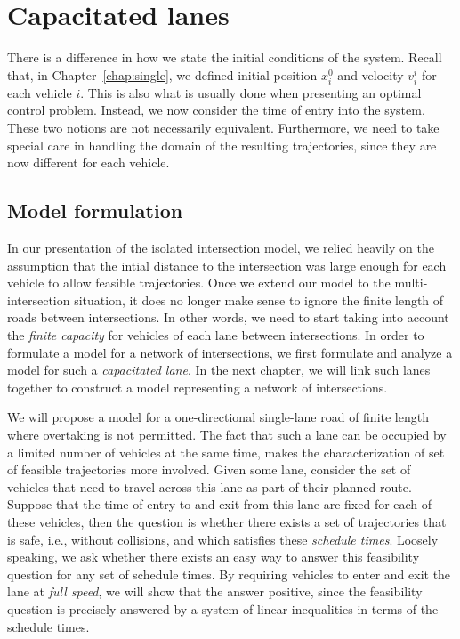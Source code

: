 \documentclass[a4paper]{report}
\theoremstyle{definition}
\theoremstyle{plain}
\newcommand\note[1]{{\color{Navy}#1}}
\begin{document}
\chapter{Capacitated lanes}\label{chap:network}

\note{
There is a difference in how we state the initial conditions of the system.
%
Recall that, in Chapter~\ref{chap:single}, we defined initial position
$x_{i}^{0}$ and velocity $v_{i}^{i}$ for each vehicle $i$.
This is also what is usually done when presenting an optimal control problem.
%
Instead, we now consider the time of entry into the system.
%
These two notions are not necessarily equivalent.
%
Furthermore, we need to take special care in handling the domain of the
resulting trajectories, since they are now different for each vehicle.
}

\section{Model formulation}

In our presentation of the isolated intersection model, we relied heavily on the
assumption that the intial distance to the intersection was large enough for
each vehicle to allow feasible trajectories.
%
Once we extend our model to the multi-intersection situation, it does no longer
make sense to ignore the finite length of roads between intersections. In other
words, we need to start taking into account the \emph{finite capacity} for
vehicles of each lane between intersections.
%
In order to formulate a model for a network of intersections, we first formulate
and analyze a model for such a \emph{capacitated lane}.
%
In the next chapter, we will link such lanes together to construct a model
representing a network of intersections.

We will propose a model for a one-directional single-lane road of finite length
where overtaking is not permitted.
%
The fact that such a lane can be occupied by a limited number of vehicles at the
same time, makes the characterization of set of feasible trajectories more
involved.
%
Given some lane, consider the set of vehicles that need to travel across this
lane as part of their planned route. Suppose that the time of entry to and exit
from this lane are fixed for each of these vehicles, then the question is
whether there exists a set of trajectories that is safe, i.e., without
collisions, and which satisfies these \emph{schedule times}.
%
Loosely speaking, we ask whether there exists an easy way to answer this
feasibility question for any set of schedule times.
%
By requiring vehicles to enter and exit the lane at \emph{full speed}, we will show
that the answer positive, since the feasibility question is precisely answered
by a system of linear inequalities in terms of the schedule times.
\end{document}
